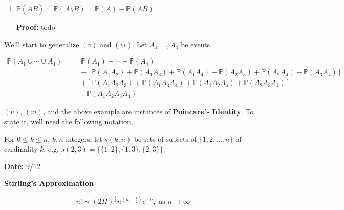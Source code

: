 \documentclass[12pt]{article}
\newcommand{\prob}[1]{\mathbb{P}(#1)}
\begin{document}
\begin{enumerate}[label=(\roman*)]
\begin{align*}
\prob{A \cup B \cup C} =  \enspace & \prob{A} + \prob{B} + \prob{C} \\
& - \prob{AB} - \prob{AC} - \prob{BC} \\
& + \prob{ABC}
\end{align*}

\begin{adjustwidth}{2.5em}{0pt}
\textbf{Proof:} todo
\end{adjustwidth}

\item $\prob{A\overline{B}} = \prob{A \setminus B} = \prob{A} - \prob{AB}$

\begin{adjustwidth}{2.5em}{0pt}
\textbf{Proof:} todo
\end{adjustwidth}

\end{enumerate}

\noindent
We'll start to generalize $(v)$ and $(vi)$. Let $A_1, \ldots, A_4$ be events.

\begin{align*}
\prob{A_1 \cup \cdots \cup A_4} = \enspace & \prob{A_1} + \cdots + \prob{A_4} \\
& - [\prob{A_1A_2} + \prob{A_1A_3} + \prob{A_1A_4} + \prob{A_2A_3} + \prob{A_2A_4} + \prob{A_3A_4}] \\
& + [\prob{A_1A_2A_3} + \prob{A_1A_3A_4} + \prob{A_1A_2A_4} + \prob{A_2A_3A_4}]  \\
& - \prob{A_1A_2A_3A_4}
\end{align*}

\noindent
$(v)$, $(vi)$, and the above example are instances of \textbf{Poincare's Identity}. To state it, well need the following notation,

\begin{adjustwidth}{5em}{5em}
For $ 0 \leq k \leq n$, $k,n$ integers, let $s(k,n)$ be sets of subsets of $\{ 1, 2, \ldots, n \}$ of cardinality $k$, e.g. $s(2,3) = \Big \{ \{ 1,2 \}, \{ 1,3 \}, \{ 2,3 \} \Big \}$.
\end{adjustwidth}


\begin{flushright}
\textbf{Date:} $9/12$
\end{flushright}


\noindent
\textbf{Stirling's Approximation}

\begin{equation*}
n! \sim (2 \Pi)^{\frac{1}{2}}n^{(n + \frac{1}{2})}e^{-n}, \text{ as } n \rightarrow \infty
\end{equation*}
\end{document}
